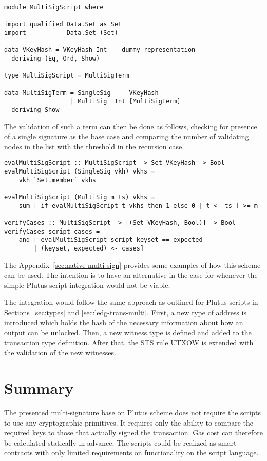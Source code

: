 \documentclass[11pt,a4paper,dvipsnames]{article}
\theoremstyle{definition}
\begin{document}
\begin{verbatim}
module MultiSigScript where

import qualified Data.Set as Set
import           Data.Set (Set)

data VKeyHash = VKeyHash Int -- dummy representation
  deriving (Eq, Ord, Show)

type MultiSigScript = MultiSigTerm

data MultiSigTerm = SingleSig     VKeyHash
                  | MultiSig  Int [MultiSigTerm]
  deriving Show
\end{verbatim}

The validation of such a term can then be done as follows, checking for presence
of a single signature as the base case and comparing the number of validating
nodes in the list with the threshold in the recursion case.

\begin{verbatim}
evalMultiSigScript :: MultiSigScript -> Set VKeyHash -> Bool
evalMultiSigScript (SingleSig vkh) vkhs =
    vkh `Set.member` vkhs

evalMultiSigScript (MultiSig m ts) vkhs =
    sum [ if evalMultiSigScript t vkhs then 1 else 0 | t <- ts ] >= m

verifyCases :: MultiSigScript -> [(Set VKeyHash, Bool)] -> Bool
verifyCases script cases =
    and [ evalMultiSigScript script keyset == expected
        | (keyset, expected) <- cases]
\end{verbatim}

The Appendix~\ref{sec:native-multi-sign} provides some examples of how this
scheme can be used. The intention is to have an alternative in the case for
whenever the simple Plutus script integration would not be viable.

The integration would follow the same approach as outlined for Plutus scripts in
Sections~\ref{sec:types} and \ref{sec:ledg-trans-multi}. First, a new type of
address is introduced which holds the hash of the necessary information about
how an output can be unlocked. Then, a new witness type is defined and added to
the transaction type definition. After that, the STS rule UTXOW is extended with
the validation of the new witnesses.

\section{Summary}
\label{sec:summary}

The presented multi-signature base on Plutus scheme does not require the scripts
to use any cryptographic primitives. It requires only the ability to compare the
required keys to those that actually signed the transaction. Gas cost can
therefore be calculated statically in advance. The scripts could be realized as
smart contracts with only limited requirements on functionality on the script
language.
\end{document}
